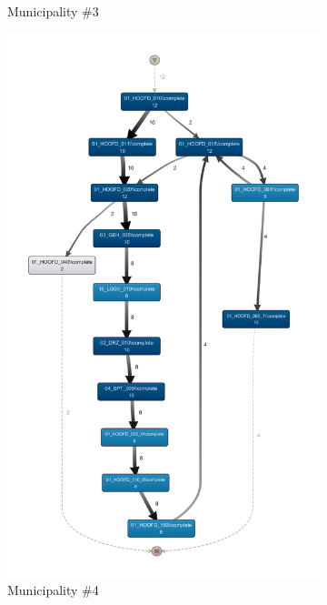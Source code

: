 \begin{figure}
\begin{subfigure}[t]{.3\textwidth}
    \caption{Municipality \#3}
    \label{fig:coselog-wabo-process-models-simplified-3}
  \end{subfigure} 
  \begin{subfigure}[t]{.4\textwidth}
    \centering
        \includegraphics[width=1\linewidth]{5_results_discussions/coselog-wabo/coselog-wabo-4-simplified}
    \caption{Municipality \#4}
    \label{fig:coselog-wabo-process-models-simplified-4}
  \end{subfigure}
    \begin{subfigure}[t]{.4\textwidth}

\end{subfigure}
\end{figure}

